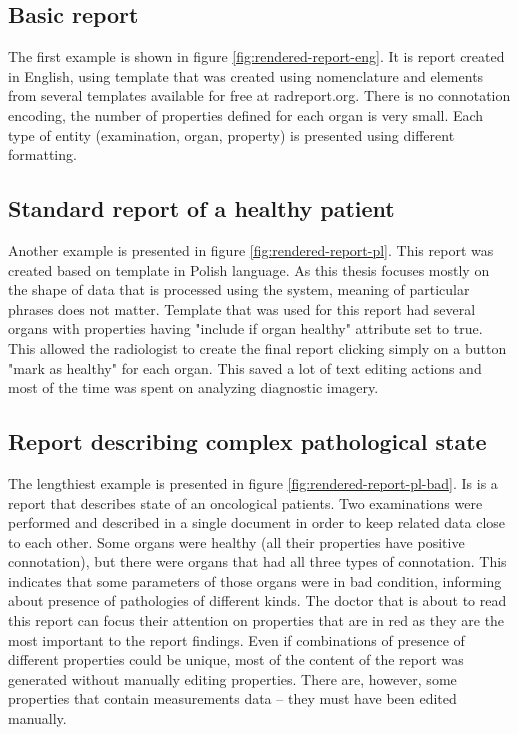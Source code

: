 \documentclass[12pt, twoside, openany]{report}
\theoremstyle{definition}
\begin{document}
\subsection{Basic report}
The first example is shown in figure \ref{fig:rendered-report-eng}. It is report created in English, using template that was created using nomenclature and elements from several templates available for free at radreport.org. There is no connotation encoding, the number of properties defined for each organ is very small. Each type of entity (examination, organ, property) is presented using different formatting.

\subsection{Standard report of a healthy patient}
Another example is presented in figure \ref{fig:rendered-report-pl}. This report was created based on template in Polish language. As this thesis focuses mostly on the shape of data that is processed using the system, meaning of particular phrases does not matter. Template that was used for this report had several organs with properties having "include if organ healthy" attribute set to true. This allowed the radiologist to create the final report clicking simply on a button "mark as healthy" for each organ. This saved a lot of text editing actions and most of the time was spent on analyzing diagnostic imagery.

\subsection{Report describing complex pathological state}
The lengthiest example is presented in figure \ref{fig:rendered-report-pl-bad}. Is is a report that describes state of an oncological patients. Two examinations were performed and described in a single document in order to keep related data close to each other. Some organs were healthy (all their properties have positive connotation), but there were organs that had all three types of connotation. This indicates that some parameters of those organs were in bad condition, informing about presence of pathologies of different kinds. The doctor that is about to read this report can focus their attention on properties that are in red as they are the most important to the report findings. Even if combinations of presence of different properties could be unique, most of the content of the report was generated without manually editing properties. There are, however, some properties that contain measurements data -- they must have been edited manually.
\end{document}
